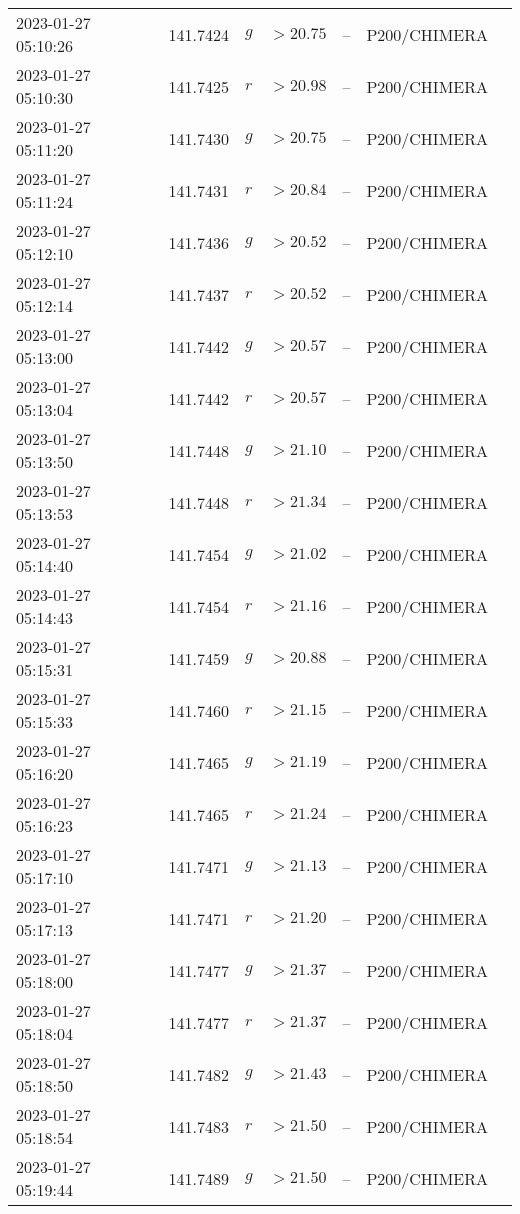 \documentclass{nature_plusfigure}
\begin{document}
\begin{supplement}
\begin{center}
\begin{longtable}{lllllll}
2023-01-27 05:10:26 & 141.7424 & $g$ & $>20.75$ & -- & P200/CHIMERA &  \\ 
2023-01-27 05:10:30 & 141.7425 & $r$ & $>20.98$ & -- & P200/CHIMERA &  \\ 
2023-01-27 05:11:20 & 141.7430 & $g$ & $>20.75$ & -- & P200/CHIMERA &  \\ 
2023-01-27 05:11:24 & 141.7431 & $r$ & $>20.84$ & -- & P200/CHIMERA &  \\ 
2023-01-27 05:12:10 & 141.7436 & $g$ & $>20.52$ & -- & P200/CHIMERA &  \\ 
2023-01-27 05:12:14 & 141.7437 & $r$ & $>20.52$ & -- & P200/CHIMERA &  \\ 
2023-01-27 05:13:00 & 141.7442 & $g$ & $>20.57$ & -- & P200/CHIMERA &  \\ 
2023-01-27 05:13:04 & 141.7442 & $r$ & $>20.57$ & -- & P200/CHIMERA &  \\ 
2023-01-27 05:13:50 & 141.7448 & $g$ & $>21.10$ & -- & P200/CHIMERA &  \\ 
2023-01-27 05:13:53 & 141.7448 & $r$ & $>21.34$ & -- & P200/CHIMERA &  \\ 
2023-01-27 05:14:40 & 141.7454 & $g$ & $>21.02$ & -- & P200/CHIMERA &  \\ 
2023-01-27 05:14:43 & 141.7454 & $r$ & $>21.16$ & -- & P200/CHIMERA &  \\ 
2023-01-27 05:15:31 & 141.7459 & $g$ & $>20.88$ & -- & P200/CHIMERA &  \\ 
2023-01-27 05:15:33 & 141.7460 & $r$ & $>21.15$ & -- & P200/CHIMERA &  \\ 
2023-01-27 05:16:20 & 141.7465 & $g$ & $>21.19$ & -- & P200/CHIMERA &  \\ 
2023-01-27 05:16:23 & 141.7465 & $r$ & $>21.24$ & -- & P200/CHIMERA &  \\ 
2023-01-27 05:17:10 & 141.7471 & $g$ & $>21.13$ & -- & P200/CHIMERA &  \\ 
2023-01-27 05:17:13 & 141.7471 & $r$ & $>21.20$ & -- & P200/CHIMERA &  \\ 
2023-01-27 05:18:00 & 141.7477 & $g$ & $>21.37$ & -- & P200/CHIMERA &  \\ 
2023-01-27 05:18:04 & 141.7477 & $r$ & $>21.37$ & -- & P200/CHIMERA &  \\ 
2023-01-27 05:18:50 & 141.7482 & $g$ & $>21.43$ & -- & P200/CHIMERA &  \\ 
2023-01-27 05:18:54 & 141.7483 & $r$ & $>21.50$ & -- & P200/CHIMERA &  \\ 
2023-01-27 05:19:44 & 141.7489 & $g$ & $>21.50$ & -- & P200/CHIMERA &  \\ 

\end{longtable}
\end{center}
\end{supplement}
\end{document}

